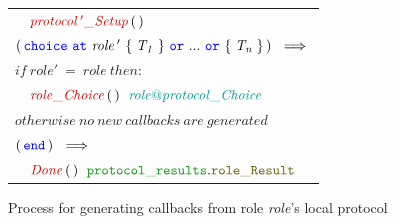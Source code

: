 \documentclass[12pt,twoside]{report}
\begin{document}
\begin{figure}[!h]
\begin{center}
\begin{tabular}{l}
            $\quad \functionname{protocol\,'\_Setup}\,(\,)$\\[15pt]

            $(\,\choice\ \at\ \mathit{role\,'}\ \{\;\mathit{T_1}\;\}\ \scror\ ...\ \scror\ \{\;\mathit{T_n}\;\}\,)\ \implies$\\[6pt]
            $\mathit{if\ role'\ =\ role\ then:}$\\[3pt]
            
            $\quad \functionname{role\_Choice}\,(\,)\;\ \enumtype{\localprotocol{role}{protocol}\_Choice}$\\[6pt]
            $\mathit{otherwise\ no\ new\ callbacks\ are\ generated}$\\[15pt]

            $(\,\scrend\,)\ \implies$\\[3pt] 
            
            $\quad \functionname{Done}\,(\,)\;\ \pkgstructaccess{protocol\_results}{role\_Result}$
        \end{tabular}
    \end{center}
    \caption{Process for generating callbacks from role \textit{role}'s local protocol}
    \label{callbacks-gen}
\end{figure}
\end{document}
